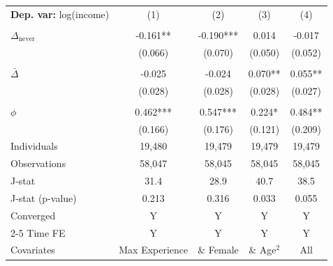 \begin{tabular}{l cccc} \toprule  \textbf{Dep. var:}  log(income) 
                    &\multicolumn{1}{c}{(1)}   &\multicolumn{1}{c}{(2)}   &\multicolumn{1}{c}{(3)}   &\multicolumn{1}{c}{(4)}   \\
                    &               &               &               &               \\
\addlinespace
$\Delta_{\text{never}}$&      -0.161** &      -0.190***&       0.014   &      -0.017   \\
                    &     (0.066)   &     (0.070)   &     (0.050)   &     (0.052)   \\
                    &               &               &               &               \\
\addlinespace
$\bar{\Delta}$      &      -0.025   &      -0.024   &       0.070** &       0.055** \\
                    &     (0.028)   &     (0.028)   &     (0.028)   &     (0.027)   \\
                    &               &               &               &               \\
\addlinespace
$\phi$              &       0.462***&       0.547***&       0.224*  &       0.484** \\
                    &     (0.166)   &     (0.176)   &     (0.121)   &     (0.209)   \\
\addlinespace
Individuals         &      19,480   &      19,479   &      19,479   &      19,479   \\
Observations        &      58,047   &      58,045   &      58,045   &      58,045   \\
J-stat              &        31.4   &        28.9   &        40.7   &        38.5   \\
J-stat (p-value)    &       0.213   &       0.316   &       0.033   &       0.055   \\
Converged           &           Y   &           Y   &           Y   &           Y   \\
\cmidrule{2-5} Time FE & Y & Y & Y & Y \\ Covariates & Max Experience & \& Female & \& Age$^2$ & All \\ \bottomrule \end{tabular}

